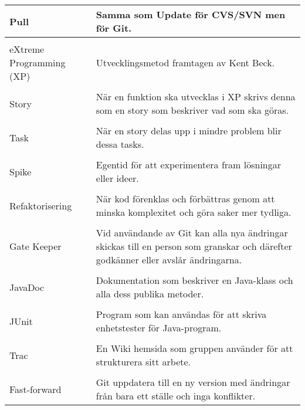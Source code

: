 \begin{table}
\begin{tabular}{ | l |  p{7cm} |}
\\Pull	 & Samma som Update för CVS/SVN men för Git. \\ \hline
\\eXtreme Programming (XP) &	Utvecklingsmetod framtagen av Kent Beck. \\ \hline
\\Story &	När en funktion ska utvecklas i XP skrivs denna som en story som beskriver vad som ska göras. \\ \hline
\\Task	& När en story delas upp i mindre problem blir dessa tasks. \\ \hline
\\Spike &	Egentid för att experimentera fram lösningar eller ideer. \\ \hline
\\Refaktorisering &	När kod förenklas och förbättras genom att minska komplexitet och göra saker mer tydliga. \\ \hline
\\Gate Keeper &	Vid användande av Git kan alla nya ändringar skickas till en person som granskar och därefter godkänner eller avslår ändringarna.  \\ \hline
\\JavaDoc &	Dokumentation som beskriver en Java-klass och alla dess publika metoder. \\ \hline
\\JUnit	& Program som kan användas för att skriva enhetstester för Java-program. \\ \hline
\\Trac	& En Wiki hemsida som gruppen använder för att strukturera sitt arbete. \\ \hline
\\Fast-forward & Git uppdatera till en ny version med ändringar från bara ett ställe och inga konflikter. \\ \hline

\end{tabular}
\end{table}
